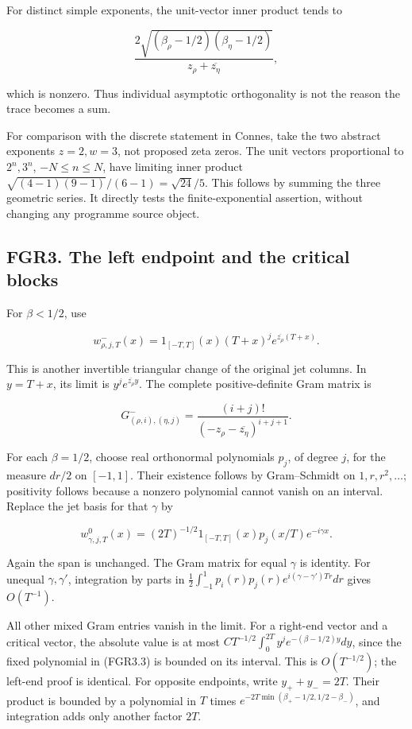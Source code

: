 For distinct simple exponents, the unit-vector inner product tends to

\[
 \frac{2\sqrt{(\beta_\rho-1/2)(\beta_\eta-1/2)}}
 {z_\rho+\overline{z_\eta}},
\tag{FGR2.3}
\]

which is nonzero. Thus individual asymptotic orthogonality is not the
reason the trace becomes a sum.

For comparison with the discrete statement in Connes, take the two
abstract exponents \(z=2,w=3\), not proposed zeta zeros. The unit
vectors proportional to \(2^n,3^n\), \(-N\leq n\leq N\), have limiting
inner product \(\sqrt{(4-1)(9-1)}/(6-1)=\sqrt{24}/5\). This follows by
summing the three geometric series. It directly tests the
finite-exponential assertion, without changing any programme source
object.

\subsection{FGR3. The left endpoint and the critical
blocks}\label{fgr3.-the-left-endpoint-and-the-critical-blocks}

For \(\beta<1/2\), use

\[
 w^-_{\rho,j,T}(x)=1_{[-T,T]}(x)(T+x)^j
                              e^{\overline{z_\rho}(T+x)}.
\tag{FGR3.1}
\]

This is another invertible triangular change of the original jet
columns. In \(y=T+x\), its limit is \(y^je^{\overline{z_\rho}y}\). The
complete positive-definite Gram matrix is

\[
 G^-_{(\rho,i),(\eta,j)}
 =\frac{(i+j)!}{(-z_\rho-\overline{z_\eta})^{i+j+1}}.
\tag{FGR3.2}
\]

For each \(\beta=1/2\), choose real orthonormal polynomials \(p_j\), of
degree \(j\), for the measure \(dr/2\) on \([-1,1]\). Their existence
follows by Gram--Schmidt on \(1,r,r^2,\ldots\); positivity follows
because a nonzero polynomial cannot vanish on an interval. Replace the
jet basis for that \(\gamma\) by

\[
 w^0_{\gamma,j,T}(x)=(2T)^{-1/2}1_{[-T,T]}(x)
                                  p_j(x/T)e^{-i\gamma x}.
\tag{FGR3.3}
\]

Again the span is unchanged. The Gram matrix for equal \(\gamma\) is
identity. For unequal \(\gamma,\gamma'\), integration by parts in
\(\tfrac12\int_{-1}^1p_i(r)p_j(r)e^{i(\gamma-\gamma')Tr}dr\) gives
\(O(T^{-1})\).

All other mixed Gram entries vanish in the limit. For a right-end vector
and a critical vector, the absolute value is at most
\(C T^{-1/2}\int_0^{2T}y^j e^{-(\beta-1/2)y}dy\), since the fixed
polynomial in (FGR3.3) is bounded on its interval. This is
\(O(T^{-1/2})\); the left-end proof is identical. For opposite
endpoints, write \(y_++y_-=2T\). Their product is bounded by a
polynomial in \(T\) times \(e^{-2T\min(\beta_+-1/2,1/2-\beta_-)}\), and
integration adds only another factor \(2T\).

